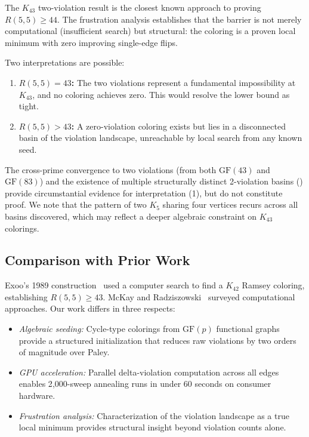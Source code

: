 \documentclass[11pt,a4paper]{article}
\theoremstyle{plain}
\theoremstyle{remark}
\newcommand{\GF}{\mathrm{GF}}
\begin{document}
The $K_{43}$ two-violation result is the closest known approach to
proving $R(5,5) \geq 44$. The frustration analysis establishes that
the barrier is not merely computational (insufficient search) but
structural: the coloring is a proven local minimum with zero
improving single-edge flips.

Two interpretations are possible:
\begin{enumerate}[leftmargin=2em]
  \item \textbf{$R(5,5) = 43$:} The two violations represent a
    fundamental impossibility at $K_{43}$, and no coloring achieves
    zero. This would resolve the lower bound as tight.
  \item \textbf{$R(5,5) > 43$:} A zero-violation coloring exists
    but lies in a disconnected basin of the violation landscape,
    unreachable by local search from any known seed.
\end{enumerate}

The cross-prime convergence to two violations (from both $\GF(43)$
and $\GF(83)$) and the existence of multiple structurally distinct
2-violation basins () provide
circumstantial evidence for interpretation (1), but do not constitute
proof. We note that the pattern of two $K_5$ sharing four vertices
recurs across all basins discovered, which may reflect a deeper
algebraic constraint on $K_{43}$ colorings.

\subsection{Comparison with Prior Work}

Exoo's 1989 construction~\cite{exoo1989} used a computer search
to find a $K_{42}$ Ramsey coloring, establishing $R(5,5) \geq 43$.
McKay and Radziszowski~\cite{mckay1995} surveyed computational
approaches. Our work differs in three respects:
\begin{itemize}[leftmargin=2em]
  \item \emph{Algebraic seeding:} Cycle-type colorings from $\GF(p)$
    functional graphs provide a structured initialization that
    reduces raw violations by two orders of magnitude over Paley.
  \item \emph{GPU acceleration:} Parallel delta-violation computation
    across all edges enables 2{,}000-sweep annealing runs in under
    60 seconds on consumer hardware.
  \item \emph{Frustration analysis:} Characterization of the violation
    landscape as a true local minimum provides structural insight
    beyond violation counts alone.
\end{itemize}
\end{document}
